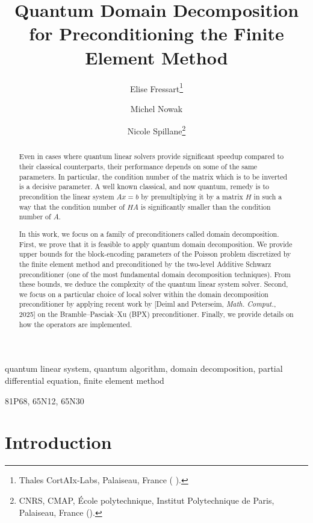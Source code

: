 \documentclass[onefignum,onetabnum]{siamart251216}
\title{Quantum Domain Decomposition for Preconditioning the Finite Element Method}
\author{Elise Fressart\footnotemark[2] \thanks{Thales CortAIx-Labs, Palaiseau, France 
  (\email{elise.fressart@thalesgroup.com} \email{michel.nowak@thalesgroup.com}).}
\and Michel Nowak\footnotemark[1]
\and Nicole Spillane\thanks{CNRS, CMAP, \'Ecole polytechnique, Institut Polytechnique de Paris, Palaiseau, France (\email{nicole.spillane@cnrs.fr}).}}
\begin{document}
\maketitle

\begin{abstract}
Even in cases where quantum linear solvers provide significant speedup compared to their classical counterparts, their performance depends on some of the same parameters. In particular, the condition number of the matrix which is to be inverted is a decisive parameter. A well known classical, and now quantum, remedy is to precondition the linear system $A x = b$ by premultiplying it by a matrix $H$ in such a way that the condition number of $HA$ is significantly smaller than the condition number of $A$. 

In this work, we focus on a family of preconditioners called domain decomposition. First, we prove that it is feasible to apply quantum domain decomposition. We provide upper bounds for the block-encoding parameters of the Poisson problem discretized by the finite element method and preconditioned by the two-level Additive Schwarz preconditioner (one of the most fundamental domain decomposition techniques). From these bounds, we deduce the complexity of the quantum linear system solver.  Second, we focus on a particular choice of local solver within the domain decomposition preconditioner by applying recent work by [Deiml and Peterseim, \textit{Math. Comput.}, 2025] on the Bramble--Pasciak--Xu (BPX) preconditioner. Finally, we provide details on how the operators are implemented.
\end{abstract}
\begin{keywords}
quantum linear system, quantum algorithm, domain decomposition, partial differential equation, finite element method
\end{keywords}

\begin{MSCcodes}
81P68, 65N12, 65N30
\end{MSCcodes}

\tableofcontents


\section{Introduction}
\end{document}
